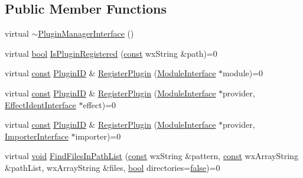 \subsection*{Public Member Functions}
\begin{DoxyCompactItemize}
\item 
virtual \hyperlink{class_plugin_manager_interface_a4da159093209229f6a9d37df8c380a12}{$\sim$\+Plugin\+Manager\+Interface} ()
\item 
virtual \hyperlink{mac_2config_2i386_2lib-src_2libsoxr_2soxr-config_8h_abb452686968e48b67397da5f97445f5b}{bool} \hyperlink{class_plugin_manager_interface_a8a4cdfa3461674c50995cfc53b26ce50}{Is\+Plugin\+Registered} (\hyperlink{getopt1_8c_a2c212835823e3c54a8ab6d95c652660e}{const} wx\+String \&path)=0
\item 
virtual \hyperlink{getopt1_8c_a2c212835823e3c54a8ab6d95c652660e}{const} \hyperlink{include_2audacity_2_types_8h_abe9b737fcebc2b5bea606246e1eab52e}{Plugin\+ID} \& \hyperlink{class_plugin_manager_interface_a893aa345c2bbf19db5343aad473b694b}{Register\+Plugin} (\hyperlink{class_module_interface}{Module\+Interface} $\ast$module)=0
\item 
virtual \hyperlink{getopt1_8c_a2c212835823e3c54a8ab6d95c652660e}{const} \hyperlink{include_2audacity_2_types_8h_abe9b737fcebc2b5bea606246e1eab52e}{Plugin\+ID} \& \hyperlink{class_plugin_manager_interface_a80c3b4fd192fe95583737337fa90bb4f}{Register\+Plugin} (\hyperlink{class_module_interface}{Module\+Interface} $\ast$provider, \hyperlink{class_effect_ident_interface}{Effect\+Ident\+Interface} $\ast$effect)=0
\item 
virtual \hyperlink{getopt1_8c_a2c212835823e3c54a8ab6d95c652660e}{const} \hyperlink{include_2audacity_2_types_8h_abe9b737fcebc2b5bea606246e1eab52e}{Plugin\+ID} \& \hyperlink{class_plugin_manager_interface_aad0c8feb87cd2374087230926d2c7e31}{Register\+Plugin} (\hyperlink{class_module_interface}{Module\+Interface} $\ast$provider, \hyperlink{class_importer_interface}{Importer\+Interface} $\ast$importer)=0
\item 
virtual \hyperlink{sound_8c_ae35f5844602719cf66324f4de2a658b3}{void} \hyperlink{class_plugin_manager_interface_ac91d28bef1836bcad03cc472478ae1b7}{Find\+Files\+In\+Path\+List} (\hyperlink{getopt1_8c_a2c212835823e3c54a8ab6d95c652660e}{const} wx\+String \&pattern, \hyperlink{getopt1_8c_a2c212835823e3c54a8ab6d95c652660e}{const} wx\+Array\+String \&path\+List, wx\+Array\+String \&files, \hyperlink{mac_2config_2i386_2lib-src_2libsoxr_2soxr-config_8h_abb452686968e48b67397da5f97445f5b}{bool} directories=\hyperlink{mac_2config_2i386_2lib-src_2libsoxr_2soxr-config_8h_a65e9886d74aaee76545e83dd09011727}{false})=0

\end{DoxyCompactItemize}
